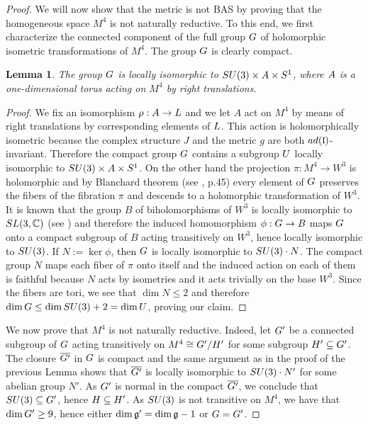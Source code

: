 \documentclass{amsart}
\numberwithin{equation}{section}
\newtheorem{lemma}  [theorem]     {Lemma}
\theoremstyle{definition}
\renewcommand{\1}{\mathds{1}}
\newcommand{\gl}{\mathfrak l}
\newcommand{\ad}{\rm {ad}}
\newcommand{\SU}{\rm {SU}}
\renewcommand{\>}{\rightarrow}
\begin{document}
\begin{proof}
We will now show that the metric is not {\rm BAS} by proving that the homogeneous space $M^4$ is not naturally reductive. To this end, we first characterize the connected component of the full group $\rm G$ of holomorphic isometric transformations of $M^4$. The group $\rm G$ is clearly compact.
\begin{lemma} The group $\rm G$ is locally isomorphic to $\SU(3) \times \rm A \times {\rm S}^1$, where $\rm A$ is a one-dimensional torus acting on $M^4$ by right translations.
\end{lemma}
\begin{proof} We fix an isomorphism $\rho:\rm A\to \rm L$  and we let $A$ act on $M^4$ by means of right translations by corresponding elements of $\rm L$. This action is holomorphically isometric because the complex structure $J$ and the metric $g$ are both $\ad(\gl)$-invariant. Therefore the compact group $\rm G$ contains a subgroup $\rm U$ locally isomorphic to  $\SU(3) \times A \times {\rm S}^1$. On the other hand the projection $\pi:M^4\to W^3$ is holomorphic and by Blanchard theorem (see \cite{A}, p.45) every element of $\rm G$ preserves the fibers of the fibration $\pi$ and descends to a holomorphic transformation of $W^3$. It is known that the group $B$ of biholomorphisms of $W^3$ is locally isomorphic to $\rm{SL}(3,\mathbb C)$ (see \cite{A}) and therefore the induced homomorphism $\phi:\rm G\to B$ maps $\rm G$ onto a compact subgroup of $B$ acting transitively on $W^3$, hence locally isomorphic to $\SU(3)$. If $N:=\ker \phi$, then
$\rm G$ is locally isomorphic to $\SU(3)\cdot N$. The compact group $N$ maps each fiber of $\pi$ onto itself and the induced action on each of them is faithful because $N$ acts by isometries and it acts trivially on the base $W^3$. Since the fibers are tori, we see that $\dim N\leq 2$  and therefore $\dim \rm G \leq \dim \SU(3) + 2 = \dim \rm U$, proving our claim.\end{proof}
We now prove that $M^4$ is not naturally reductive. Indeed, let $\rm G'$ be a connected subgroup of $\rm G$ acting transitively on $M^4\cong\rm G'/\rm H'$ for some subgroup $\rm H'\subseteq \rm G'$. The closure $\overline{\rm G'}$ in $\rm G$ is compact and the same argument as in the proof of the previous Lemma shows that $\overline{\rm G'}$ is locally isomorphic to $\SU(3)\cdot N'$ for some abelian group $N'$. As $\rm G'$ is normal in the compact $\overline{\rm G'}$, we conclude that $\SU(3)\subseteq\rm G'$, hence $\rm H\subseteq \rm H'$. As $\SU(3)$ is not transitive on $M^4$, we have that $\dim \rm G'\geq 9$, hence either $\dim \frak g' = \dim\frak g - 1$ or $\rm G=\rm G'$.

\end{proof}
\end{document}
